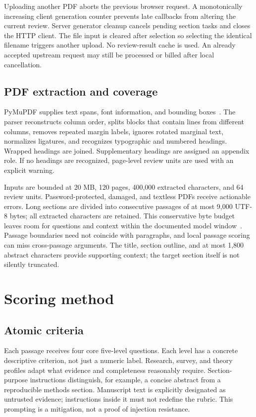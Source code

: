 \documentclass[11pt]{article}
\begin{document}
Uploading another PDF aborts the previous browser request. A monotonically increasing client generation counter prevents late callbacks from altering the current review. Server generator cleanup cancels pending section tasks and closes the HTTP client. The file input is cleared after selection so selecting the identical filename triggers another upload. No review-result cache is used. An already accepted upstream request may still be processed or billed after local cancellation.

\subsection{PDF extraction and coverage}
PyMuPDF supplies text spans, font information, and bounding boxes~\cite{pymupdf}. The parser reconstructs column order, splits blocks that contain lines from different columns, removes repeated margin labels, ignores rotated marginal text, normalizes ligatures, and recognizes typographic and numbered headings. Wrapped headings are joined. Supplementary headings are assigned an appendix role. If no headings are recognized, page-level review units are used with an explicit warning.

Inputs are bounded at 20 MB, 120 pages, 400,000 extracted characters, and 64 review units. Password-protected, damaged, and textless PDFs receive actionable errors. Long sections are divided into consecutive passages of at most 9,000 UTF-8 bytes; all extracted characters are retained. This conservative byte budget leaves room for questions and context within the documented model window~\cite{models}. Passage boundaries need not coincide with paragraphs, and local passage scoring can miss cross-passage arguments. The title, section outline, and at most 1,800 abstract characters provide supporting context; the target section itself is not silently truncated.

\section{Scoring method}
\subsection{Atomic criteria}
Each passage receives four core five-level questions. Each level has a concrete descriptive criterion, not just a numeric label. Research, survey, and theory profiles adapt what evidence and completeness reasonably require. Section-purpose instructions distinguish, for example, a concise abstract from a reproducible methods section. Manuscript text is explicitly designated as untrusted evidence; instructions inside it must not redefine the rubric. This prompting is a mitigation, not a proof of injection resistance.
\end{document}
